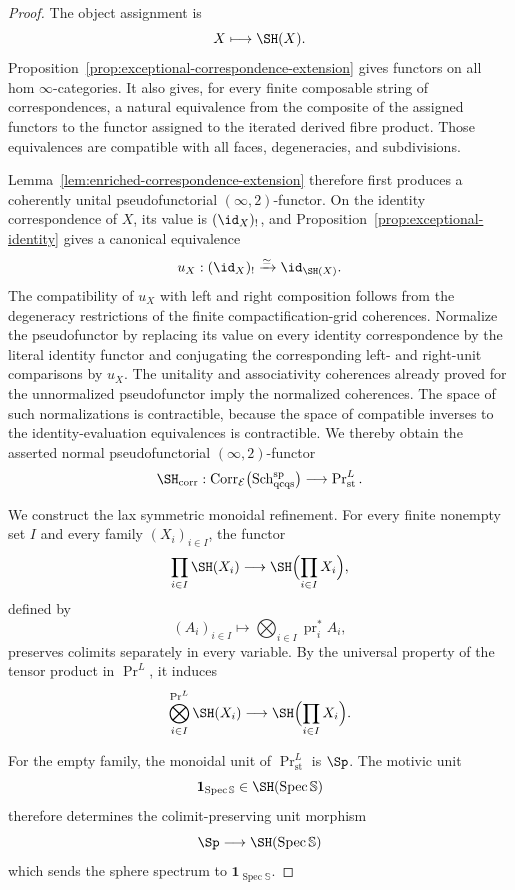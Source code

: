 \begin{proof}
The object assignment is
\[
    X\longmapsto\SH(X).
\]
Proposition~\ref{prop:exceptional-correspondence-extension} gives functors
on all hom \(\infty\)-categories.  It also gives, for every finite
composable string of correspondences, a natural equivalence from the
composite of the assigned functors to the functor assigned to the iterated
derived fibre product.  Those equivalences are compatible with all faces,
degeneracies, and subdivisions.

Lemma~\ref{lem:enriched-correspondence-extension} therefore first
produces a coherently unital pseudofunctorial \((\infty,2)\)-functor.  On
the identity correspondence of \(X\), its value is \((\id_X)_!\), and
Proposition~\ref{prop:exceptional-identity} gives a canonical equivalence
\[
    u_X:
    (\id_X)_!
    \xrightarrow{\simeq}
    \id_{\SH(X)}.
\]
The compatibility of \(u_X\) with left and right composition follows from
the degeneracy restrictions of the finite compactification-grid
coherences.  Normalize the pseudofunctor by replacing its value on every
identity correspondence by the literal identity functor and conjugating
the corresponding left- and right-unit comparisons by \(u_X\).  The
unitality and associativity coherences already proved for the unnormalized
pseudofunctor imply the normalized coherences.  The space of such
normalizations is contractible, because the space of compatible inverses to
the identity-evaluation equivalences is contractible.  We thereby obtain
the asserted normal pseudofunctorial \((\infty,2)\)-functor
\[
    \SH_{\mathrm{corr}}:
    \operatorname{Corr}_{\mathcal E}
    \bigl(
      \operatorname{Sch}^{\mathrm{sp}}_{\mathrm{qcqs}}
    \bigr)
    \longrightarrow
    \operatorname{Pr}^L_{\mathrm{st}}.
\]

We construct the lax symmetric monoidal refinement.  For every finite
nonempty set \(I\) and every family \((X_i)_{i\in I}\), the functor
\[
    \prod_{i\in I}\SH(X_i)
    \longrightarrow
    \SH\Bigl(\prod_{i\in I}X_i\Bigr),
\]
defined by
\[
    (A_i)_{i\in I}
    \longmapsto
    \bigotimes_{i\in I}\operatorname{pr}_i^*A_i,
\]
preserves colimits separately in every variable.  By the universal property
of the tensor product in \(\operatorname{Pr}^L\), it induces
\[
    \bigotimes_{i\in I}^{\operatorname{Pr}^L}\SH(X_i)
    \longrightarrow
    \SH\Bigl(\prod_{i\in I}X_i\Bigr).
\]

For the empty family, the monoidal unit of
\(\operatorname{Pr}^L_{\mathrm{st}}\) is \(\Sp\).  The motivic unit
\[
    \mathbf1_{\operatorname{Spec}\mathbb S}
    \in
    \SH(\operatorname{Spec}\mathbb S)
\]
therefore determines the colimit-preserving unit morphism
\[
    \Sp
    \longrightarrow
    \SH(\operatorname{Spec}\mathbb S)
\]
which sends the sphere spectrum to
\(\mathbf1_{\operatorname{Spec}\mathbb S}\).


\end{proof}
